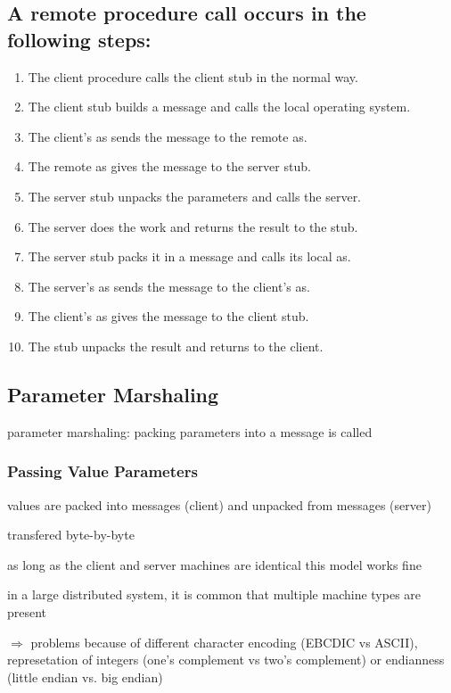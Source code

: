 \documentclass[ngerman,a4paper]{report}
\begin{document}
\subsection*{A remote procedure call occurs in the following steps:}

\begin{enumerate}
	\item The client procedure calls the client stub in the normal way. 
	\item The client stub builds a message and calls the local operating system. 
	\item The client's as sends the message to the remote as. 
	\item The remote as gives the message to the server stub. 
	\item The server stub unpacks the parameters and calls the server.
	\item The server does the work and returns the result to the stub. 
	\item The server stub packs it in a message and calls its local as. 
	\item The server's as sends the message to the client's as. 
	\item The client's as gives the message to the client stub. 
	\item The stub unpacks the result and returns to the client.
\end{enumerate}

\subsection*{Parameter Marshaling}

parameter marshaling: packing parameters into a message is called 


\subsubsection*{Passing Value Parameters}

\begin{compactitem}
	\item values are packed into messages (client) and unpacked from messages (server)
	\item transfered byte-by-byte
	\item as long as the client and server machines are identical this model works fine
	\item in a large distributed system, it is common that multiple machine types are present
	\item $\Rightarrow$ problems because of different character encoding (EBCDIC vs ASCII), represetation of integers (one's complement vs two's complement) or endianness (little endian vs. big endian)
\end{compactitem}
\end{document}
